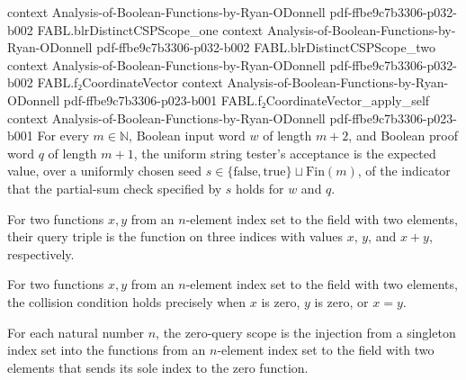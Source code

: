 \begin{theorem}
  {context}
  {Analysis-of-Boolean-Functions-by-Ryan-ODonnell}
  {pdf-ffbe9c7b3306-p032-b002}
\proofstep
  {FABL.blrDistinctCSPScope_one}
  {context}
  {Analysis-of-Boolean-Functions-by-Ryan-ODonnell}
  {pdf-ffbe9c7b3306-p032-b002}
\proofstep
  {FABL.blrDistinctCSPScope_two}
  {context}
  {Analysis-of-Boolean-Functions-by-Ryan-ODonnell}
  {pdf-ffbe9c7b3306-p032-b002}
\proofstep
  {FABL.f₂CoordinateVector}
  {context}
  {Analysis-of-Boolean-Functions-by-Ryan-ODonnell}
  {pdf-ffbe9c7b3306-p023-b001}
\proofstep
  {FABL.f₂CoordinateVector_apply_self}
  {context}
  {Analysis-of-Boolean-Functions-by-Ryan-ODonnell}
  {pdf-ffbe9c7b3306-p023-b001}
For every $m\in\mathbb{N}$, Boolean input word $w$ of length $m+2$, and Boolean proof
word $q$ of length $m+1$, the uniform string tester's acceptance is the expected value,
over a uniformly chosen seed
$s\in\{\mathrm{false},\mathrm{true}\}\sqcup\mathrm{Fin}(m)$, of the indicator that the
partial-sum check specified by $s$ holds for $w$ and $q$.
\end{theorem}

\begin{definition}
\label{FABL.blrQueryTriple}
\leanok
{}
For two functions $x,y$ from an $n$-element index set to the field with two elements,
their query triple is the function on three indices with values $x$, $y$, and $x+y$,
respectively.
\end{definition}

\begin{definition}
\label{FABL.BLRQueriesCollide}
\leanok
{}
For two functions $x,y$ from an $n$-element index set to the field with two elements,
the collision condition holds precisely when $x$ is zero, $y$ is zero, or $x=y$.
\end{definition}

\begin{definition}
\label{FABL.blrZeroCSPScope}
\leanok
{}
For each natural number $n$, the zero-query scope is the injection from a singleton
index set into the functions from an $n$-element index set to the field with two
elements that sends its sole index to the zero function.
\end{definition}

